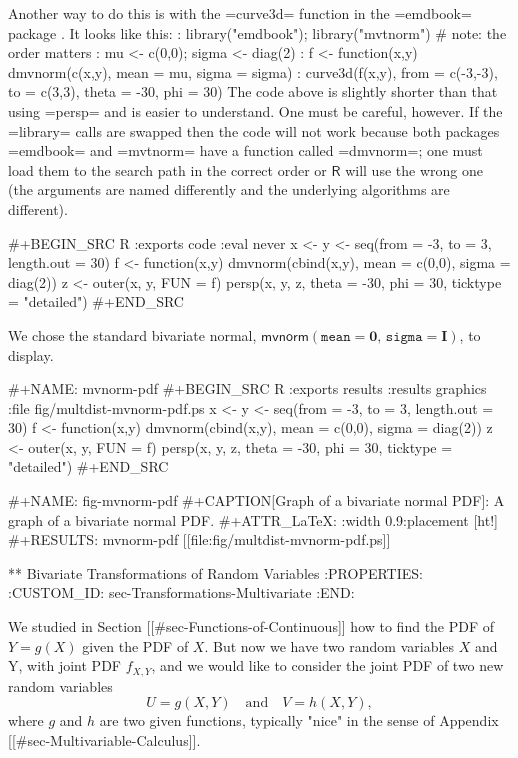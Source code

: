 Another way to do this is with the =curve3d= function in the =emdbook=
package \cite{emdbook}. It looks like this:
: library("emdbook"); library("mvtnorm") # note: the order matters
: mu <- c(0,0); sigma <- diag(2)
: f <- function(x,y) dmvnorm(c(x,y), mean = mu, sigma = sigma)
: curve3d(f(x,y), from = c(-3,-3), to = c(3,3), theta = -30, phi = 30)
The code above is slightly shorter than that using =persp= and is
easier to understand. One must be careful, however. If the =library=
calls are swapped then the code will not work because both packages
=emdbook= and =mvtnorm= have a function called =dmvnorm=; one must
load them to the search path in the correct order or \(\mathsf{R}\)
will use the wrong one (the arguments are named differently and the
underlying algorithms are different).

#+BEGIN_SRC R :exports code :eval never
x <- y <- seq(from = -3, to = 3, length.out = 30)
f <- function(x,y) dmvnorm(cbind(x,y), mean = c(0,0), sigma = diag(2))
z <- outer(x, y, FUN = f)
persp(x, y, z, theta = -30, phi = 30, ticktype = "detailed")
#+END_SRC

We chose the standard bivariate normal,
\(\mathsf{mvnorm}(\mathtt{mean}=\mathbf{0},\,\mathtt{sigma}=\mathbf{I})\),
to display.

#+NAME: mvnorm-pdf
#+BEGIN_SRC R :exports results :results graphics :file fig/multdist-mvnorm-pdf.ps
x <- y <- seq(from = -3, to = 3, length.out = 30)
f <- function(x,y) dmvnorm(cbind(x,y), mean = c(0,0), sigma = diag(2))
z <- outer(x, y, FUN = f)
persp(x, y, z, theta = -30, phi = 30, ticktype = "detailed")
#+END_SRC

#+NAME: fig-mvnorm-pdf
#+CAPTION[Graph of a bivariate normal PDF]: \small A graph of a bivariate normal PDF.
#+ATTR_LaTeX: :width 0.9\textwidth :placement [ht!]
#+RESULTS: mvnorm-pdf
[[file:fig/multdist-mvnorm-pdf.ps]]

** Bivariate Transformations of Random Variables
:PROPERTIES:
:CUSTOM_ID: sec-Transformations-Multivariate
:END:

We studied in Section [[#sec-Functions-of-Continuous]] how to find the PDF
of \(Y=g(X)\) given the PDF of \(X\). But now we have two random
variables \(X\) and Y, with joint PDF \(f_{X,Y}\), and we would like
to consider the joint PDF of two new random variables
\begin{equation}
U=g(X,Y)\quad \mbox{and}\quad V=h(X,Y),
\end{equation}
where \(g\) and \(h\) are two given functions, typically "nice" in
the sense of Appendix [[#sec-Multivariable-Calculus]].

